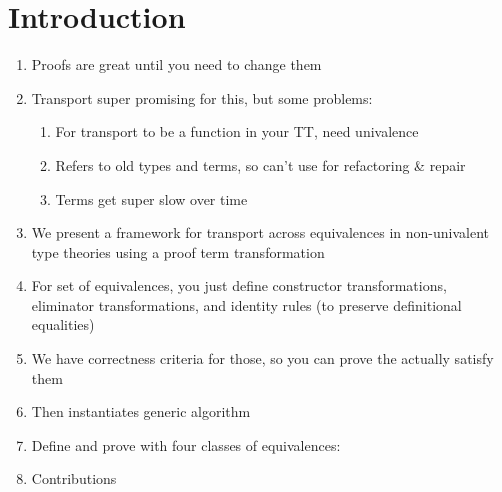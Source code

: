 \section{Introduction}

\begin{enumerate}
  \item Proofs are great until you need to change them
  \item Transport super promising for this, but some problems:
  \begin{enumerate}
    \item For transport to be a function in your TT, need univalence
    \item Refers to old types and terms, so can't use for refactoring & repair
    \item Terms get super slow over time
  \end{enumerate}
  \item We present a framework for transport across equivalences in non-univalent type theories using a proof term transformation
  \item For set of equivalences, you just define constructor transformations, eliminator transformations, and identity rules (to preserve definitional equalities)
  \item We have correctness criteria for those, so you can prove the actually satisfy them
  \item Then instantiates generic algorithm
  \item Define and prove with four classes of equivalences:
  \item Contributions
\end{enumerate}
